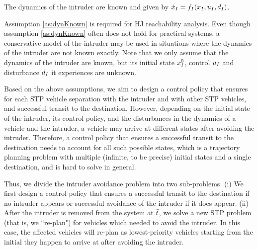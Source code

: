 \begin{assumption}
\label{as:dynKnown}
The dynamics of the intruder are known and given by $\dot{x}_I = f_I(x_I, u_I, d_I)$.
\end{assumption}
Assumption \ref{as:dynKnown} is required for HJ reachability analysis. Even though assumption \ref{as:dynKnown} often does not hold for practical systems, a conservative model of the intruder may be used in situations where the dynamics of the intruder are not known exactly. Note that we only assume that the dynamics of the intruder are known, but its initial state $x_{I}^{0}$, control $u_I$ and disturbance $d_I$ it experiences are unknown.

Based on the above assumptions, we aim to design a control policy that ensures for each STP vehicle separation with the intruder and with other STP vehicles, and successful transit to the destination. However, depending on the initial state of the intruder, its control policy, and the disturbances in the dynamics of a vehicle and the intruder, a vehicle may arrive at different states after avoiding the intruder. Therefore, a control policy that ensures a successful transit to the destination needs to account for all such possible states, which is a trajectory planning problem with multiple (infinite, to be precise) initial states and a single destination, and is hard to solve in general. 

Thus, we divide the intruder avoidance problem into two sub-problems. (i) We first design a control policy that ensures a successful transit to the destination if no intruder appears or successful avoidance of the intruder if it does appear. (ii) After the intruder is removed from the system at $\bar{t}$, we solve a new STP problem (that is, we ``re-plan") for vehicles which needed to avoid the intruder. In this case, the affected vehicles will re-plan as lowest-priority vehicles starting from the initial they happen to arrive at after avoiding the intruder. 
